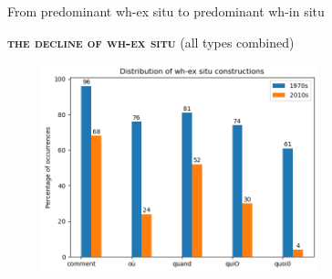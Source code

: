 \documentclass[lesson_slides]{subfiles}
\begin{document}
\begin{frame}[c]{From predominant wh-ex situ to predominant wh-in situ}

    \textbf{\textsc{the decline of wh-ex situ}} (all types combined)
    \begin{center}
        \includegraphics[width=10cm, height=6cm]{images/exsituall.png}
    \end{center}
  
\end{frame}
\end{document}
